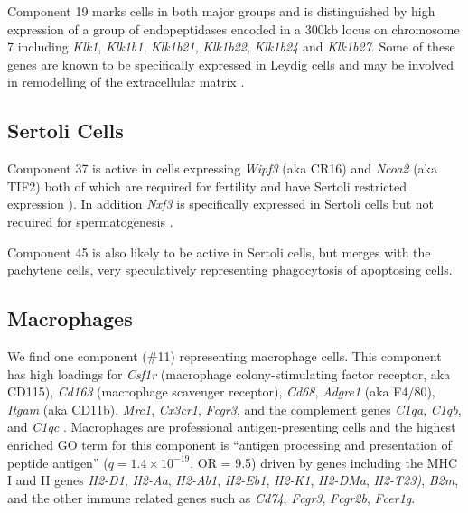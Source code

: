 Component 19 marks cells in both major groups and is distinguished by high expression of a group of endopeptidases encoded in a 300kb locus on chromosome 7 including \textit{Klk1}, \textit{Klk1b1}, \textit{Klk1b21}, \textit{Klk1b22}, \textit{Klk1b24} and \textit{Klk1b27}.
Some of these genes are known to be specifically expressed in Leydig cells and may be involved in remodelling of the extracellular matrix \parencite{Sanz2013RiboTag, Matsui2000Cloning, Matsui2001Mouse, Matsui2005Characterization}.

\subsection{Sertoli Cells}

Component 37 is active in cells expressing \textit{Wipf3} (aka CR16) and \textit{Ncoa2} (aka TIF2) both of which are required for fertility and have Sertoli restricted expression \parencite{Suetsugu2007Malespecific, Gehin2002Function}).
In addition \textit{Nxf3} is specifically expressed in Sertoli cells but not required for spermatogenesis \parencite{Zhou2011Nxf3}.

Component 45 is also likely to be active in Sertoli cells, but merges with the pachytene cells, very speculatively representing phagocytosis of apoptosing cells.


\subsection{Macrophages}
We find one component (\#11) representing macrophage cells.
This component has high loadings for \textit{Csf1r} (macrophage colony-stimulating factor receptor, aka CD115), \textit{Cd163} (macrophage scavenger receptor), \textit{Cd68}, \textit{Adgre1} (aka F4/80), \textit{Itgam} (aka CD11b), \textit{Mrc1}, \textit{Cx3cr1}, \textit{Fcgr3}, and the complement genes \textit{C1qa}, \textit{C1qb}, and \textit{C1qc} \parencite{Mossadegh-Keller2017Developmental, Fabriek2005macrophage, Sasmono2012Generation}.
Macrophages are professional antigen-presenting cells and the highest enriched GO term for this component is ``antigen processing and presentation of peptide antigen'' ($q = 1.4\times10^{-19}$, OR = 9.5) driven by genes including the MHC I and II genes \textit{H2-D1}, \textit{H2-Aa}, \textit{H2-Ab1}, \textit{H2-Eb1}, \textit{H2-K1}, \textit{H2-DMa}, \textit{H2-T23)}, \textit{B2m}, and the other immune related genes such as \textit{Cd74}, \textit{Fcgr3}, \textit{Fcgr2b}, \textit{Fcer1g}.

